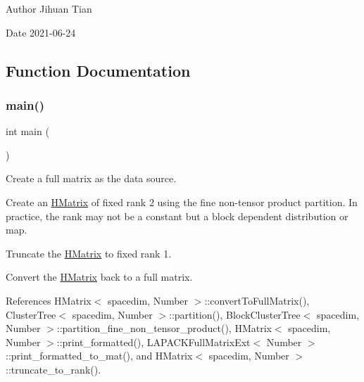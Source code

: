 \begin{DoxyAuthor}{Author}
Jihuan Tian 
\end{DoxyAuthor}
\begin{DoxyDate}{Date}
2021-\/06-\/24 
\end{DoxyDate}


\subsection{Function Documentation}
\mbox{\label{hmatrix-truncate-to-fixed-rank_8cc_ae66f6b31b5ad750f1fe042a706a4e3d4}} 
\subsubsection{\texorpdfstring{main()}{main()}}
{\footnotesize\ttfamily int main (\begin{DoxyParamCaption}{ }\end{DoxyParamCaption})}

Create a full matrix as the data source.

Create an \hyperlink{classHMatrix}{H\+Matrix} of fixed rank 2 using the fine non-\/tensor product partition. In practice, the rank may not be a constant but a block dependent distribution or map.

Truncate the \hyperlink{classHMatrix}{H\+Matrix} to fixed rank 1.

Convert the \hyperlink{classHMatrix}{H\+Matrix} back to a full matrix.

References H\+Matrix$<$ spacedim, Number $>$\+::convert\+To\+Full\+Matrix(), Cluster\+Tree$<$ spacedim, Number $>$\+::partition(), Block\+Cluster\+Tree$<$ spacedim, Number $>$\+::partition\+\_\+fine\+\_\+non\+\_\+tensor\+\_\+product(), H\+Matrix$<$ spacedim, Number $>$\+::print\+\_\+formatted(), L\+A\+P\+A\+C\+K\+Full\+Matrix\+Ext$<$ Number $>$\+::print\+\_\+formatted\+\_\+to\+\_\+mat(), and H\+Matrix$<$ spacedim, Number $>$\+::truncate\+\_\+to\+\_\+rank().

